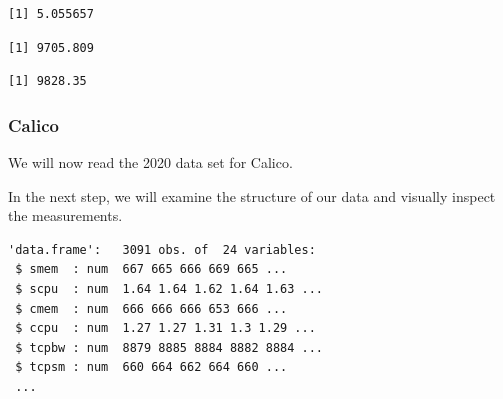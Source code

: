 \begin{verbatim}
[1] 5.055657
\end{verbatim}

\begin{Shaded}
\begin{Highlighting}[]
\SpecialCharTok{\$}
\end{Highlighting}
\end{Shaded}

\begin{verbatim}
[1] 9705.809
\end{verbatim}

\begin{Shaded}
\begin{Highlighting}[]
\SpecialCharTok{\$}
\end{Highlighting}
\end{Shaded}

\begin{verbatim}
[1] 9828.35
\end{verbatim}

\subsubsection{Calico}

We will now read the 2020 data set for Calico.

\begin{Shaded}
\begin{Highlighting}[]
\OtherTok{\textless{}{-}} 
\OtherTok{\textless{}{-}} \NormalTok{(}\NormalTok{,}\NormalTok{))}
\end{Highlighting}
\end{Shaded}

In the next step, we will examine the structure of our data and visually
inspect the measurements.

\begin{Shaded}
\begin{Highlighting}[]
\end{Highlighting}
\end{Shaded}

\begin{verbatim}
'data.frame':   3091 obs. of  24 variables:
 $ smem  : num  667 665 666 669 665 ...
 $ scpu  : num  1.64 1.64 1.62 1.64 1.63 ...
 $ cmem  : num  666 666 666 653 666 ...
 $ ccpu  : num  1.27 1.27 1.31 1.3 1.29 ...
 $ tcpbw : num  8879 8885 8884 8882 8884 ...
 $ tcpsm : num  660 664 662 664 660 ...
 ...
\end{verbatim}

